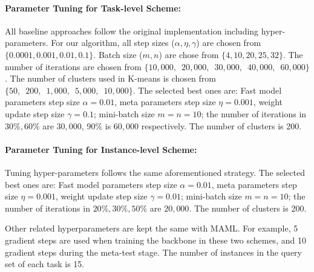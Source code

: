 \paragraph{Parameter Tuning for Task-level Scheme: }All baseline approaches follow the original implementation including hyper-parameters. For our \sysname{} algorithm, all step sizes ($\alpha, \eta, \gamma$) are chosen from $\{0.0001, 0.001, 0.01, 0.1\}$. Batch size ($m,n$) are chose from $\{4, 10, 20, 25, 32\}$. The number of iterations are chosen from $\{10,000,\enspace 20,000,\enspace 30,000,\enspace 40,000,\enspace 60,000\}$. The number of clusters used in K-means is chosen from $\{50,\enspace 200,\enspace 1,000,\enspace 5,000,\enspace 10,000\}$. The selected best ones are: Fast model parameters step size $\alpha=0.01$, meta parameters step size $\eta=0.001$, weight update step size $\gamma=0.1$; mini-batch size $m=n=10$; the number of iterations in $30\%,60\%$ are $30,000$, $90\%$ is $60,000$ respectively. The number of clusters is 200. 

\paragraph{Parameter Tuning for Instance-level Scheme: }Tuning hyper-parameters follows the same aforementioned strategy. The selected best ones are: Fast model parameters step size $\alpha=0.01$, meta parameters step size $\eta=0.001$, weight update step size $\gamma=0.01$; mini-batch size $m=n=10$; the number of iterations in $20\%,30\%,50\%$ are $20,000$. The number of clusters is 200.  

Other related hyperparameters are kept the same with MAML. For example, 5 gradient steps are used when training the backbone in these two schemes, and 10 gradient steps during the meta-test stage. The number of instances in the query set of each task is 15.
